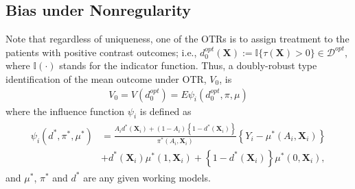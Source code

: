 \documentclass[11pt]{article}
\theoremstyle{referenceplain}
\theoremstyle{referencedefinition}
\theoremstyle{referenceremark}
\begin{document}
\subsection{Bias under Nonregularity}
Note that regardless of uniqueness, one of the OTRs is to assign treatment to the patients with positive contrast outcomes; i.e., $d^{o p t}_0(\mathbf{X}):=\mathbb{I}\{\tau(\mathbf{X})>0\}\in \mathcal{D}^{ {opt }}$, where $\mathbb{I}(\cdot)$ stands for the indicator function. Thus, a doubly-robust type identification of the mean outcome under OTR, $V_0$, is
\begin{align}\label{identification}
    V_0=V\left(d^{o p t}_0\right)=E\psi_i\left(d^{opt}_0, \pi, \mu\right)
\end{align}
where the influence function $\psi_i$ is defined as
\begin{align}\label{AIPWE-IF}
    \begin{aligned}
\psi_i\left(d^*, \pi^*, \mu^*\right) &=\frac{A_i d^*\left(\mathbf{X}_i\right)+\left(1-A_i\right)\left\{1-d^*\left(\mathbf{X}_i\right)\right\}}{\pi^*\left(A_i, \mathbf{X}_i\right)}\left\{Y_i-\mu^*\left(A_i, \mathbf{X}_i\right)\right\} \\
&+d^*\left(\mathbf{X}_i\right) \mu^*\left(1, \mathbf{X}_i\right)+\left\{1-d^*\left(\mathbf{X}_i\right)\right\} \mu^*\left(0, \mathbf{X}_i\right),
\end{aligned}
\end{align}
and $\mu^*$, $\pi^*$ and $d^*$ are any given working models.
\end{document}
